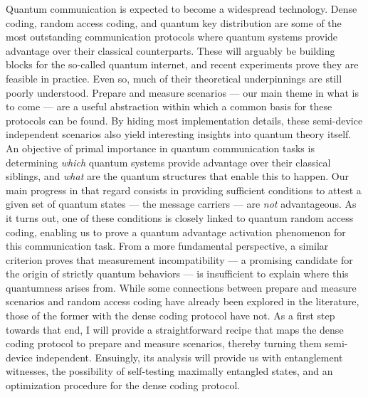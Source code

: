 Quantum communication is expected to become a widespread technology. Dense coding, random access coding, and quantum key distribution are some of the most outstanding communication protocols where quantum systems provide advantage over their classical counterparts. These will arguably be building blocks for the so-called quantum internet, and recent experiments prove they are feasible in practice. Even so, much of their theoretical underpinnings are still poorly understood. Prepare and measure scenarios --- our main theme in what is to come --- are a useful abstraction within which a common basis for these protocols can be found. By hiding most implementation details, these semi-device independent scenarios also yield interesting insights into quantum theory itself. An objective of primal importance in quantum communication tasks is determining \emph{which} quantum systems provide advantage over their classical siblings, and \emph{what} are the quantum structures that enable this to happen. Our main progress in that regard consists in providing sufficient conditions to attest a given set of quantum states --- the message carriers --- are \emph{not} advantageous. As it turns out, one of these conditions is closely linked to quantum random access coding, enabling us to prove a quantum advantage activation phenomenon for this communication task. From a more fundamental perspective, a similar criterion proves that measurement incompatibility --- a promising candidate for the origin of strictly quantum behaviors --- is insufficient to explain where this quantumness arises from. While some connections between prepare and measure scenarios and random access coding have already been explored in the literature, those of the former with the dense coding protocol have not. As a first step towards that end, I will provide a straightforward recipe that maps the dense coding protocol to prepare and measure scenarios, thereby turning them semi-device independent. Ensuingly, its analysis will provide us with entanglement witnesses, the possibility of self-testing maximally entangled states, and an optimization procedure for the dense coding protocol.



\endgroup